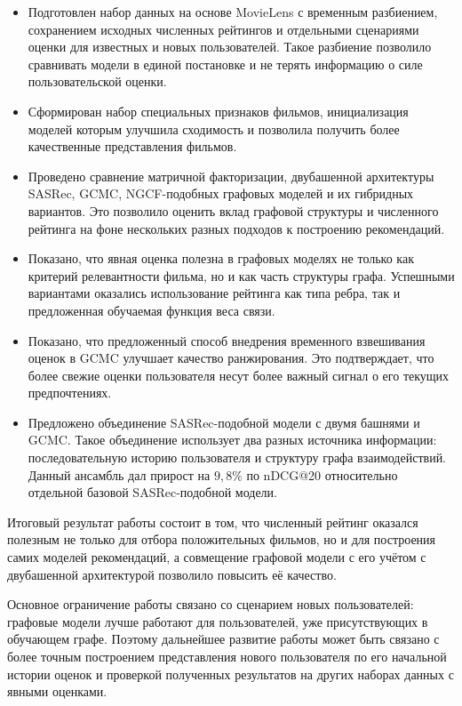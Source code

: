 \documentclass[12pt,fleqn]{article}
\begin{document}
\begin{itemize}
    \item Подготовлен набор данных на основе MovieLens с временным разбиением,
    сохранением исходных численных рейтингов и отдельными сценариями оценки
    для известных и новых пользователей. Такое разбиение позволило сравнивать
    модели в единой постановке и не терять информацию о силе пользовательской
    оценки.

    \item Сформирован набор специальных признаков фильмов, инициализация моделей которым улучшила сходимость и позволила получить
    более качественные представления фильмов.

    \item Проведено сравнение матричной факторизации, двубашенной архитектуры SASRec,
    GCMC, NGCF-подобных графовых моделей и их гибридных вариантов. Это
    позволило оценить вклад графовой структуры и численного рейтинга на фоне
    нескольких разных подходов к построению рекомендаций.

    \item Показано, что явная оценка полезна в графовых моделях не только как
    критерий релевантности фильма, но и как часть структуры графа. Успешными вариантами оказались использование рейтинга как типа ребра, так и
    предложенная обучаемая функция веса связи.

    \item Показано, что предложенный способ внедрения временного взвешивания оценок в GCMC улучшает качество
    ранжирования. Это подтверждает, что более свежие оценки пользователя
    несут более важный сигнал о его текущих предпочтениях.

    \item Предложено объединение SASRec-подобной модели с двумя башнями и GCMC.
    Такое объединение использует два разных источника информации:
    последовательную историю пользователя и структуру графа взаимодействий.
    Данный ансамбль дал прирост на $9{,}8\%$ по nDCG@20
    относительно отдельной базовой SASRec-подобной модели.
\end{itemize}

Итоговый результат работы состоит в том, что численный рейтинг оказался
полезным не только для отбора положительных фильмов, но и для построения
самих моделей рекомендаций, а совмещение графовой модели с его учётом с двубашенной архитектурой позволило повысить её качество.

Основное ограничение работы связано со сценарием новых пользователей: графовые
модели лучше работают для пользователей, уже присутствующих в обучающем графе.
Поэтому дальнейшее развитие работы может быть связано с более точным построением
представления нового пользователя по его начальной истории оценок и проверкой
полученных результатов на других наборах данных с явными оценками.
\end{document}
